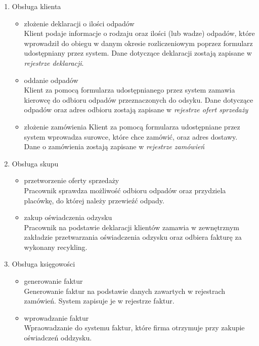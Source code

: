 
\begin{enumerate}
	\item Obsługa klienta
		\begin{itemize}
			\item złożenie deklaracji o ilości odpadów \\
			Klient podaje informacje o rodzaju oraz ilości (lub wadze) odpadów, które wprowadził do obiegu w danym okresie rozliczeniowym poprzez formularz udostępniany przez system. Dane dotyczące deklaracji zostają zapisane w \emph{rejestrze deklaracji}.
			\item oddanie odpadów \\
			Klient za pomocą formularza udostępnianego przez system zamawia kierowcę do odbioru odpadów przeznaczonych do odsyku.
			Dane dotyczące odpadów oraz adres odbioru zostają zapisane w \emph{rejestrze ofert sprzedaży}
			\item złożenie zamówienia
			Klient za pomocą formularza udostępniane przez system wprowadza surowce, które chce zamówić, oraz adres dostawy. Dane o zamówienia zostają zapisane w \emph{rejestrze zamówień}
		\end{itemize}

	\item Obsługa skupu
		\begin{itemize}
			\item przetworzenie oferty sprzedaży \\
			Pracownik sprawdza możliwość odbioru odpadów oraz przydziela placówkę, do której należy przewieźć odpady.
			\item zakup oświadczenia odzysku \\ 
			Pracownik na podstawie deklaracji klientów zamawia w zewnętrznym zakładzie przetwarzania oświadczenia odzysku oraz odbiera fakturę za wykonany recykling.
		\end{itemize}

	\item Obsługa księgowości
		\begin{itemize}
			\item generowanie faktur \\ 
			Generowanie faktur na podstawie danych zawartych w rejestrach zamówień. System zapisuje je w rejestrze faktur.
			\item wprowadzanie faktur \\
			Wpraowadzanie do systemu faktur, które firma otrzymuje przy zakupie oświadczeń oddzysku.
		\end{itemize}


\end{enumerate}
